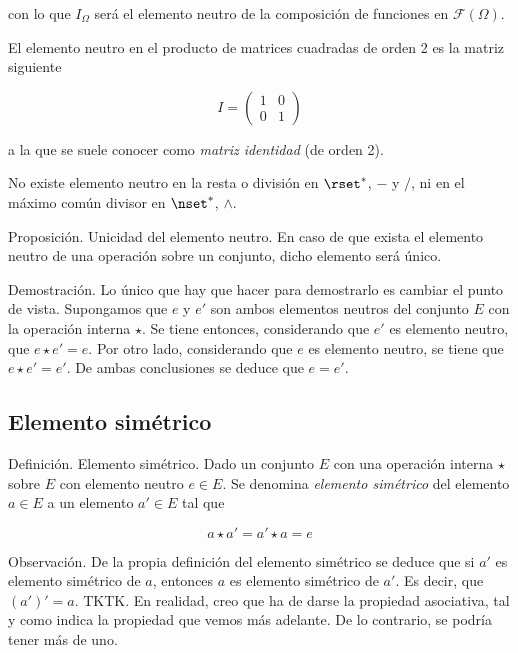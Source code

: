 \noindent con lo que $I_\Omega$ será el elemento neutro de la composición de
funciones en $\mathcal{F}(\Omega)$.

El elemento neutro en el producto de matrices cuadradas de orden 2 es la
matriz siguiente

$$
  I =
  \begin{pmatrix}
    1 & 0 \\
    0 & 1
  \end{pmatrix}
$$

\noindent a la que se suele conocer como \emph{matriz identidad} (de orden
2).

No existe elemento neutro en la resta o división en $\rset^*$, $-$ y $/$, ni
en el máximo común divisor en $\nset^*$, $\land$.

Proposición. Unicidad del elemento neutro. En caso de que exista el elemento
neutro de una operación sobre un conjunto, dicho elemento será único.

Demostración. Lo único que hay que hacer para demostrarlo es cambiar el
punto de vista. Supongamos que $e$ y $e'$ son ambos elementos neutros del
conjunto $E$ con la operación interna $\star$. Se tiene entonces,
considerando que $e'$ es elemento neutro, que $e \star e' = e$. Por otro
lado, considerando que $e$ es elemento neutro, se tiene que $e \star e' =
e'$. De ambas conclusiones se deduce que $e = e'$.





\subsection{Elemento simétrico}

Definición. Elemento simétrico. Dado un conjunto $E$ con una operación
interna $\star$ sobre $E$ con elemento neutro $e \in E$. Se denomina
\emph{elemento simétrico} del elemento $a \in E$ a un elemento $a' \in E$
tal que

$$ a \star a' = a' \star a = e $$

Observación. De la propia definición del elemento simétrico se deduce que si
$a'$ es elemento simétrico de $a$, entonces $a$ es elemento simétrico de
$a'$. Es decir, que $(a')' = a$. TKTK. En realidad, creo que ha de darse la
propiedad asociativa, tal y como indica la propiedad que vemos más adelante.
De lo contrario, se podría tener más de uno.


